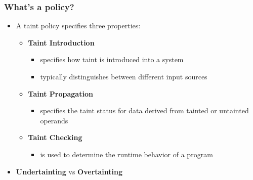 \begin{frame}%
	\frametitle{What's a policy?}
	\begin{itemize}
		\item A taint policy specifies three properties:
		\begin{itemize}
			\item \textbf{Taint Introduction}
			\begin{itemize}
				\item specifies how taint is introduced into a system
				\item typically distinguishes between different input sources
			\end{itemize}
			\item \textbf{Taint Propagation}
			\begin{itemize}
				\item specifies the taint status for data derived from tainted or untainted operands
			\end{itemize}
			\item \textbf{Taint Checking}
			\begin{itemize}
				\item is used to determine the runtime behavior of a program
			\end{itemize}
		\end{itemize}
		\item \textbf{Undertainting} vs \textbf{Overtainting}
	\end{itemize}
\end{frame}